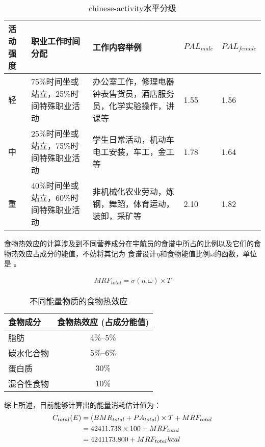 \documentclass[a4paper]{standalone}
\begin{document}
\begin{table}[H]
  \centering
  \caption{chinese-activity水平分级}
  \label{tab:chinese-activity}
  \begin{tabularx}{\textwidth}{|X|X|X|X|X|} \hline
    活动强度 & 职业工作时间分配 & 工作内容举例　& $PAL_{male}$ & $PAL_{female}$ \tabularnewline \hline
    轻 & 75\%时间坐或站立，25\%时间特殊职业活动 & 办公室工作，修理电器钟表售货员，酒店服务员，化学实验操作，讲课等 & 1.55 & 1.56 \tabularnewline \hline
    中 & 25\%时间坐或站立，75\%时间特殊职业活动 & 学生日常活动，机动车电工安装，车工，金工等 & 1.78 & 1.64 \tabularnewline \hline
    重 & 40\%时间坐或站立，60\%时间特殊职业活动 & 非机械化农业劳动，炼钢，舞蹈，体育运动，装卸，采矿等 & 2.10 & 1.82 \tabularnewline\hline
  \end{tabularx}
\end{table}

食物热效应的计算涉及到不同营养成分在宇航员的食谱中所占的比例以及它们的食物热效应占成分的能值，不妨将其记为
食谱设计$\eta$和食物能值比例$\omega$的函数，单位是 \EnergyUnit 。

\begin{align}
  MRF_{total} = \sigma(\eta, \omega) \times T
\end{align}
\begin{table}
  \centering
  \caption{不同能量物质的食物热效应}
  \label{tab:FoodDynamic}
  \begin{tabular}{|l|c|}\hline
    食物成分 & 食物热效应 (占成分能值) \\ \hline
    脂肪 & 4\%--5\% \\ \hline
    碳水化合物 & 5\%--6\% \\ \hline
    蛋白质 & 30\% \\ \hline
    混合性食物 & 10\% \\ \hline
  \end{tabular}
\end{table}
综上所述，目前能够计算出的能量消耗估计值为：
\begin{align*}
  C_{total}(E) &= (BMR_{total} + PA_{total}) \times T + MRF_{total} \\
                 &= 42411.738 \times 100 + MRF_{total} \\
                 &= 4241173.800 + MRF_{total} kcal
\end{align*}

\def\NutrientsUnit{kcal\cdot d^{-1}}
\end{document}
